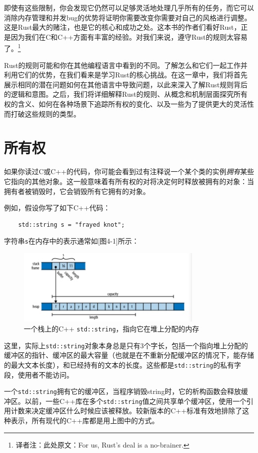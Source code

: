 即使有这些限制，你会发现它仍然可以足够灵活地处理几乎所有的任务，而它可以消除内存管理和并发bug的优势将证明你需要改变你需要对自己的风格进行调整。这是Rust最大的赌注，也是它的核心和成功之处。这本书的作者们看好Rust，正是因为我们在C和C++方面有丰富的经验。对我们来说，遵守Rust的规则太容易了。\footnote{译者注：此处原文：For us, Rust's deal is a no-brainer.}

Rust的规则可能和你在其他编程语言中看到的不同。了解怎么和它们一起工作并利用它们的优势，在我们看来是学习Rust的核心挑战。在这一章中，我们将首先展示相同的潜在问题如何在其他语言中导致问题，以此来深入了解Rust规则背后的逻辑和意图。之后，我们将详细解释Rust的规则、从概念和机制层面探究所有权的含义、如何在各种场景下追踪所有权的变化、以及一些为了提供更大的灵活性而打破这些规则的类型。

\section{所有权}

如果你读过C或C++的代码，你可能会看到过有注释说一个某个类的实例\emph{拥有}某些它指向的其他对象。这一般意味着有所有权的对将决定何时释放被拥有的对象：当拥有者被销毁时，它会销毁所有它拥有的对象。

例如，假设你写了如下C++代码：
\begin{verbatim}
    std::string s = "frayed knot";
\end{verbatim}

字符串\texttt{s}在内存中的表示通常如\hyperref[f4-1][图4-1]所示：
\begin{figure}
    \centering
    \includegraphics[width=0.8\textwidth]{../img/f4-1.png}
    \caption{一个栈上的C++ \texttt{std::string}，指向它在堆上分配的内存}
    \label{f4-1}
\end{figure}

这里，实际上\texttt{std::string}对象本身总是只有3个字长，包括一个指向堆上分配的缓冲区的指针、缓冲区的最大容量（也就是在不重新分配缓冲区的情况下，能存储的最大文本长度），和已经持有的文本的长度。这些都是\texttt{std::string}的私有字段，使用者不能访问。

一个\texttt{std::string}拥有它的缓冲区，当程序销毁string时，它的析构函数会释放缓冲区。以前，一些C++库在多个\texttt{std::string}值之间共享单个缓冲区，使用一个引用计数来决定缓冲区什么时候应该被释放。较新版本的C++标准有效地排除了这种表示，所有现代的C++库都是用上图中的方式。

